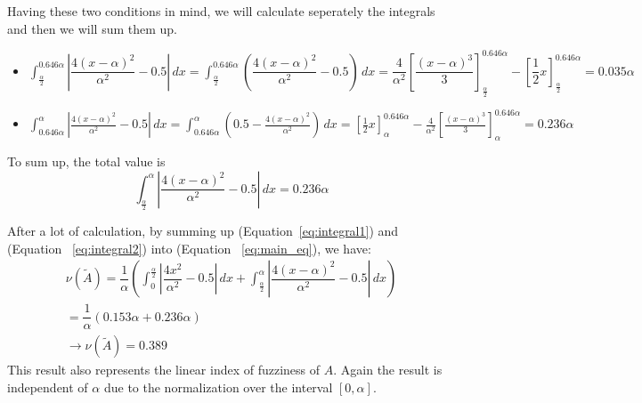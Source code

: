 Having these two conditions in mind, we will calculate seperately the integrals and then we will sum them up.
\begin{itemize}
	\item $\displaystyle \int_{\frac{\alpha}{2}}^{0.646\alpha} \left| \dfrac{4(x-\alpha)^2}{\alpha^2} - 0.5 \right| \, dx = \int_{\frac{\alpha}{2}}^{0.646\alpha}\left(\dfrac{4(x-\alpha)^2}{\alpha^2} - 0.5 \right)\, dx =  \dfrac{4}{\alpha^2}\left[\dfrac{\left(x - \alpha\right)^3}{3}\right]^{0.646\alpha}_{\frac{\alpha}{2}} - \left[\dfrac{1}{2}x\right]^{0.646\alpha}_{\frac{\alpha}{2}} = 0.035\alpha $ 
	\vspace{3mm}
	
	\item $\displaystyle \int_{0.646\alpha}^{\alpha} \left| \frac{4(x-\alpha)^2}{\alpha^2} - 0.5 \right| \, dx =\int_{0.646\alpha}^{\alpha} \left(0.5 - \frac{4(x-\alpha)^2}{\alpha^2} \right) \, dx = \left[\frac{1}{2}x\right]^{0.646\alpha}_{\alpha} -  \frac{4}{\alpha^2}\left[\frac{\left(x - \alpha\right)^3}{3}\right]^{0.646\alpha}_{\alpha} =
	 0.236\alpha
$\end{itemize}
\vspace{4mm}
To sum up, the total value is \\
\begin{equation}
	\displaystyle \int_{\frac{\alpha}{2}}^{\alpha} \left| \dfrac{4(x-\alpha)^2}{\alpha^2} - 0.5 \right| \, dx = 0.236\alpha
\end{equation}
\label{eq:integral2}

After a lot of calculation, by summing up (Equation~\ref{eq:integral1}) and (Equation ~\ref{eq:integral2}) into (Equation ~\ref{eq:main_eq}), we have:
\begin{gather*}
	\nu(\tilde{A}) = \dfrac{1}{\alpha} \left( \int_{0}^{\frac{\alpha}{2}} \left| \dfrac{4x^2}{\alpha^2} - 0.5 \right| \, dx + \int_{\frac{\alpha}{2}}^{\alpha} \left| \dfrac{4(x-\alpha)^2}{\alpha^2} - 0.5 \right| \, dx \right) \\
	= \dfrac{1}{\alpha}\left(0.153\alpha + 0.236\alpha \right) \\
	\rightarrow \nu(\tilde{A}) = 0.389
\end{gather*}
This result also represents the linear index of fuzziness of $A$. Again the result is independent of $\alpha$ due to the normalization over the interval $[0,\alpha]$.
\vspace{3mm}




